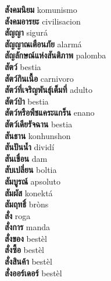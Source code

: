 \textbf{ สังคมนิยม  } komunismo \\
\textbf{ สังคมอารยะ  } civilisacion \\
\textbf{ สัญญา  } sigurá \\
\textbf{ สัญญาณเตือนภัย  } alarmá \\
\textbf{ สัญลักษณ์แห่งสันติภาพ  } palomba \\
\textbf{ สัตว์  } bestia \\
\textbf{ สัตว์กินเนื้อ  } carnivoro \\
\textbf{ สัตว์ที่เจริญพันธุ์เต็มที่  } adulto \\
\textbf{ สัตว์ป่า  } bestia \\
\textbf{ สัตว์หรือพืชแคระแกร็น  } enano \\
\textbf{ สัตว์เดียรัจฉาน  } bestia \\
\textbf{ สันธาน  } konhunshon \\
\textbf{ สันปันน้ำ  } dividí \\
\textbf{ สันเขื่อน  } dam \\
\textbf{ สับเปลี่ยน  } boltia \\
\textbf{ สัมบูรณ์  } apsoluto \\
\textbf{ สัมผัส  } konektá \\
\textbf{ สัมฤทธิ์  } bròns \\
\textbf{ สั่ง  } roga \\
\textbf{ สั่งการ  } manda \\
\textbf{ สั่งของ  } bestèl \\
\textbf{ สั่งซื้อ  } bestèl \\
\textbf{ สั่งสินค้า  } bestèl \\
\textbf{ สั่งออร์เดอร์  } bestèl \\
